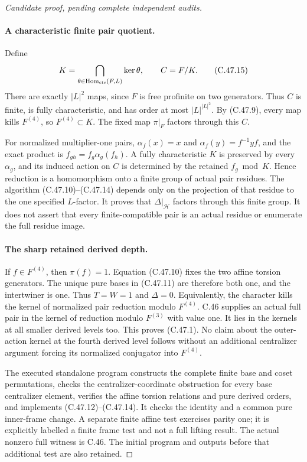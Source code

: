 \begin{proof}[Candidate proof, pending complete independent audits]
\paragraph{A characteristic finite pair quotient.}
Define
\[
 K=\bigcap_{\theta\in\operatorname{Hom}_{\rm cts}(F,L)}\ker\theta,
                       \qquad C=F/K.                \tag{C.47.15}
\]
There are exactly $|L|^2$ maps, since $F$ is free profinite on
two generators. Thus $C$ is finite, is fully characteristic,
and has order at most $|L|^{|L|^2}$. By (C.47.9), every map
kills $F^{(4)}$, so $F^{(4)}\subset K$. The fixed map
$\pi|_F$ factors through this $C$.

For normalized multiplier-one pairs,
$\alpha_f(x)=x$ and $\alpha_f(y)=f^{-1}yf$, and the exact
product is $f_{gh}=f_g\alpha_g(f_h)$. A fully characteristic $K$ is
preserved by every $\alpha_g$, and its induced action on $C$
is determined by the retained $f_g\bmod K$. Hence reduction
is a homomorphism onto a finite group of actual pair residues.
The algorithm (C.47.10)--(C.47.14) depends only on the projection
of that residue to the one specified $L$-factor. It proves that
$\Delta|_{\mathcal H}$ factors through this finite group.
It does not assert that every finite-compatible pair is an
actual residue or enumerate the full residue image.

\paragraph{The sharp retained derived depth.}
If $f\in F^{(4)}$, then $\pi(f)=1$. Equation (C.47.10)
fixes the two affine torsion generators. The unique pure bases
in (C.47.11) are therefore both one, and the intertwiner is one.
Thus $T=W=1$ and $\Delta=0$. Equivalently, the character kills
the kernel of normalized pair reduction modulo $F^{(4)}$.
C.46 supplies an actual full pair in the kernel of reduction
modulo $F^{(3)}$ with value one. It lies in the kernels at all
smaller derived levels too. This proves (C.47.1).
No claim about the outer-action kernel at the fourth derived
level follows without an additional centralizer argument forcing
its normalized conjugator into $F^{(4)}$.

The executed standalone program
constructs the complete finite base and coset permutations,
checks the centralizer-coordinate obstruction for every base
centralizer element, verifies the affine torsion relations and
pure derived orders, and implements (C.47.12)--(C.47.14).
It checks the identity and a common pure inner-frame change.
A separate finite affine test exercises parity one; it is explicitly
labelled a finite frame test and not a full lifting result.
The actual nonzero full witness is C.46. The initial program and
outputs before that additional test are also retained.
\end{proof}
